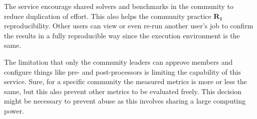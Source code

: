 The service encourage shared solvers and benchmarks in the community to reduce duplication of effort.
This also helps the community practice $\bm{R_1}$ reproducibility.
Other users can view or even re-run another user's job to confirm the results in a fully reproducible way since the execution environment is the same.

The limitation that only the community leaders can approve members and configure things like pre- and post-processors is limiting the capability of this service.
Sure, for a specific community the measured metrics is more or less the same, but this also prevent other metrics to be evaluated freely.
This decision might be necessary to prevent abuse as this involves sharing a large computing power.

